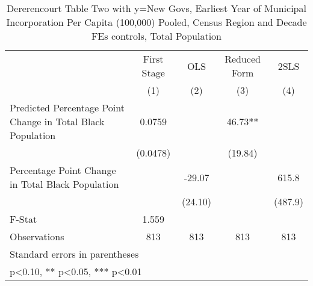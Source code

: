 \begin{table}[htbp]\centering
\def\sym#1{\ifmmode^{#1}\else\(^{#1}\)\fi}
\caption{Dererencourt Table Two with y=New Govs, Earliest Year of Municipal Incorporation Per Capita (100,000) Pooled, Census Region and Decade FEs controls, Total Population}
\begin{tabular}{l*{4}{c}}
\toprule
                    & First Stage   &         OLS   &Reduced Form   &        2SLS   \\
                    &\multicolumn{1}{c}{(1)}   &\multicolumn{1}{c}{(2)}   &\multicolumn{1}{c}{(3)}   &\multicolumn{1}{c}{(4)}   \\
\midrule
Predicted Percentage Point Change in Total Black Population&      0.0759   &               &       46.73** &               \\
                    &    (0.0478)   &               &     (19.84)   &               \\
\addlinespace
Percentage Point Change in Total Black Population&               &      -29.07   &               &       615.8   \\
                    &               &     (24.10)   &               &     (487.9)   \\
\midrule
F-Stat              &       1.559   &               &               &               \\
Observations        &         813   &         813   &         813   &         813   \\
\bottomrule
\multicolumn{5}{l}{\footnotesize Standard errors in parentheses}\\
\multicolumn{5}{l}{\footnotesize * p<0.10, ** p<0.05, *** p<0.01}\\
\end{tabular}
\end{table}
